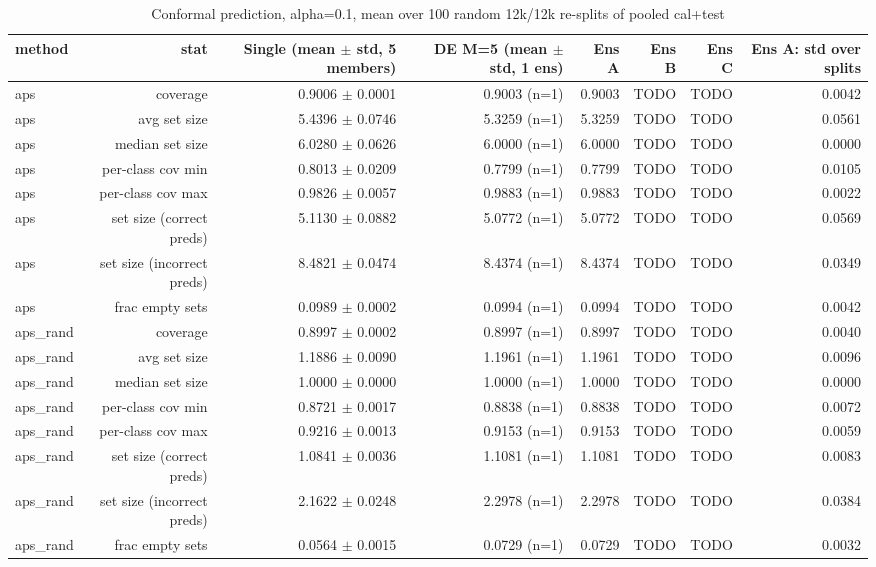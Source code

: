 \begin{table}
\caption{Conformal prediction, alpha=0.1, mean over 100 random 12k/12k re-splits of pooled cal+test}
\label{tab:de_conformal}
\begin{tabular}{lrrrrrrr}
\toprule
method & stat & Single (mean $\pm$ std, 5 members) & DE M=5 (mean $\pm$ std, 1 ens) & Ens A & Ens B & Ens C & Ens A: std over splits \\
\midrule
aps & coverage & 0.9006 $\pm$ 0.0001 & 0.9003 (n=1) & 0.9003 & TODO & TODO & 0.0042 \\
aps & avg set size & 5.4396 $\pm$ 0.0746 & 5.3259 (n=1) & 5.3259 & TODO & TODO & 0.0561 \\
aps & median set size & 6.0280 $\pm$ 0.0626 & 6.0000 (n=1) & 6.0000 & TODO & TODO & 0.0000 \\
aps & per-class cov min & 0.8013 $\pm$ 0.0209 & 0.7799 (n=1) & 0.7799 & TODO & TODO & 0.0105 \\
aps & per-class cov max & 0.9826 $\pm$ 0.0057 & 0.9883 (n=1) & 0.9883 & TODO & TODO & 0.0022 \\
aps & set size (correct preds) & 5.1130 $\pm$ 0.0882 & 5.0772 (n=1) & 5.0772 & TODO & TODO & 0.0569 \\
aps & set size (incorrect preds) & 8.4821 $\pm$ 0.0474 & 8.4374 (n=1) & 8.4374 & TODO & TODO & 0.0349 \\
aps & frac empty sets & 0.0989 $\pm$ 0.0002 & 0.0994 (n=1) & 0.0994 & TODO & TODO & 0.0042 \\
aps\_rand & coverage & 0.8997 $\pm$ 0.0002 & 0.8997 (n=1) & 0.8997 & TODO & TODO & 0.0040 \\
aps\_rand & avg set size & 1.1886 $\pm$ 0.0090 & 1.1961 (n=1) & 1.1961 & TODO & TODO & 0.0096 \\
aps\_rand & median set size & 1.0000 $\pm$ 0.0000 & 1.0000 (n=1) & 1.0000 & TODO & TODO & 0.0000 \\
aps\_rand & per-class cov min & 0.8721 $\pm$ 0.0017 & 0.8838 (n=1) & 0.8838 & TODO & TODO & 0.0072 \\
aps\_rand & per-class cov max & 0.9216 $\pm$ 0.0013 & 0.9153 (n=1) & 0.9153 & TODO & TODO & 0.0059 \\
aps\_rand & set size (correct preds) & 1.0841 $\pm$ 0.0036 & 1.1081 (n=1) & 1.1081 & TODO & TODO & 0.0083 \\
aps\_rand & set size (incorrect preds) & 2.1622 $\pm$ 0.0248 & 2.2978 (n=1) & 2.2978 & TODO & TODO & 0.0384 \\
aps\_rand & frac empty sets & 0.0564 $\pm$ 0.0015 & 0.0729 (n=1) & 0.0729 & TODO & TODO & 0.0032 \\

\end{tabular}
\end{table}
